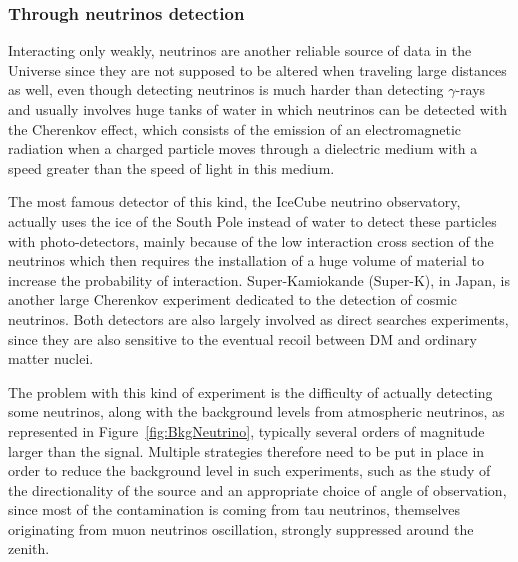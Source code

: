\documentclass[a4paper, 10pt, openright]{report}
\begin{document}
\subsubsection*{Through neutrinos detection}
Interacting only weakly, neutrinos are another reliable source of data in the Universe since they are not supposed to be altered when traveling large distances as well, even though detecting neutrinos is much harder than detecting $\gamma$-rays and usually involves huge tanks of water in which neutrinos can be detected with the Cherenkov effect, which consists of the emission of an electromagnetic radiation when a charged particle moves through a dielectric medium with a speed greater than the speed of light in this medium.

The most famous detector of this kind, the IceCube neutrino observatory, actually uses the ice of the South Pole instead of water to detect these particles with photo-detectors, mainly because of the low interaction cross section of the neutrinos which then requires the installation of a huge volume of material to increase the probability of interaction. Super-Kamiokande (Super-K), in Japan, is another large Cherenkov experiment dedicated to the detection of cosmic neutrinos. Both detectors are also largely involved as direct searches experiments, since they are also sensitive to the eventual recoil between \ac{DM} and ordinary matter nuclei.

The problem with this kind of experiment is the difficulty of actually detecting some neutrinos, along with the background levels from atmospheric neutrinos, as represented in Figure~\ref{fig:BkgNeutrino}, typically several orders of magnitude larger than the signal. Multiple strategies therefore need to be put in place in order to reduce the background level in such experiments, such as the study of the directionality of the source and an appropriate choice of angle of observation, since most of the contamination is coming from tau neutrinos, themselves originating from muon neutrinos oscillation, strongly suppressed around the zenith.
\end{document}
